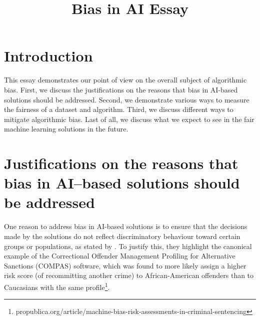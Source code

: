\documentclass[conference]{IEEEtran}
\begin{document}
\title{Bias in AI Essay
}


\maketitle





\section{Introduction}
This essay demonstrates our point of view on the overall subject of algorithmic bias. First, we discuss the justifications on the reasons that bias in AI-based solutions should be addressed. Second, we demonstrate various ways to measure the fairness of a dataset and algorithm. Third, we discuss different ways to mitigate algorithmic bias. Last of all, we discuss what we expect to see in the fair machine learning solutions in the future.

\section{Justifications on the reasons that bias in AI–based solutions should be addressed}
One reason to address bias in AI-based solutions is to ensure that the decisions made by the solutions do not reflect discriminatory behaviour toward certain groups or populations, as stated by \cite{DBLP:journals/corr/abs-1908-09635}. To justify this, they highlight the canonical example of the Correctional Offender Management Profiling for Alternative Sanctions (COMPAS) software, which was found to more likely assign a higher risk score (of recommitting another crime) to African-American offenders than to Caucasians with the same profile\footnote{propublica.org/article/machine-bias-risk-assessments-in-criminal-sentencing}. 
\end{document}
